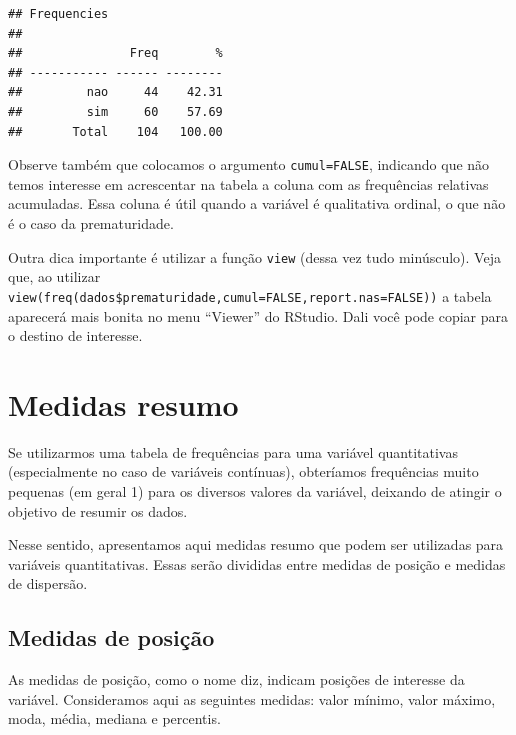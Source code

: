 \documentclass[
]{book}
\newenvironment{Shaded}{\begin{snugshade}}{\end{snugshade}}
\newcommand{\DataTypeTok}[1]{\textcolor[rgb]{0.13,0.29,0.53}{#1}}
\newcommand{\KeywordTok}[1]{\textcolor[rgb]{0.13,0.29,0.53}{\textbf{#1}}}
\newcommand{\NormalTok}[1]{#1}
\newcommand{\OperatorTok}[1]{\textcolor[rgb]{0.81,0.36,0.00}{\textbf{#1}}}
\newcommand{\OtherTok}[1]{\textcolor[rgb]{0.56,0.35,0.01}{#1}}
\begin{document}
\begin{Shaded}
\end{Shaded}

\begin{verbatim}
## Frequencies  
## 
##               Freq        %
## ----------- ------ --------
##         nao     44    42.31
##         sim     60    57.69
##       Total    104   100.00
\end{verbatim}

Observe também que colocamos o argumento \texttt{cumul=FALSE}, indicando que não temos interesse em acrescentar na tabela a coluna com as frequências relativas acumuladas. Essa coluna é útil quando a variável é qualitativa ordinal, o que não é o caso da prematuridade.

Outra dica importante é utilizar a função \texttt{view} (dessa vez tudo minúsculo). Veja que, ao utilizar \texttt{view(freq(dados\$prematuridade,cumul=FALSE,report.nas=FALSE))} a tabela aparecerá mais bonita no menu ``Viewer'' do RStudio. Dali você pode copiar para o destino de interesse.

\hypertarget{medidas-resumo}{%
\section{Medidas resumo}\label{medidas-resumo}}

Se utilizarmos uma tabela de frequências para uma variável quantitativas (especialmente no caso de variáveis contínuas), obteríamos frequências muito pequenas (em geral 1) para os diversos valores da variável, deixando de atingir o objetivo de resumir os dados.

Nesse sentido, apresentamos aqui medidas resumo que podem ser utilizadas para variáveis quantitativas. Essas serão divididas entre medidas de posição e medidas de dispersão.

\hypertarget{medidas-de-posiuxe7uxe3o}{%
\subsection{Medidas de posição}\label{medidas-de-posiuxe7uxe3o}}

As medidas de posição, como o nome diz, indicam posições de interesse da variável. Consideramos aqui as seguintes medidas: valor mínimo, valor máximo, moda, média, mediana e percentis.
\end{document}

